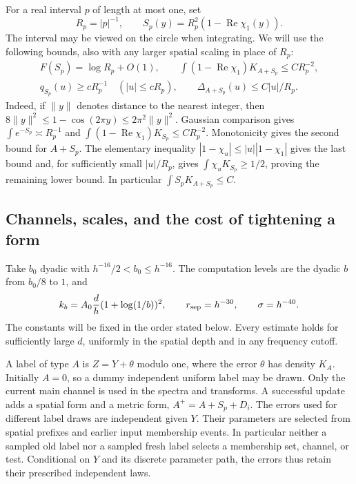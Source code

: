For a real interval $p$ of length at most one, set
\[
 R_p=|p|^{-1},\qquad
 S_p(y)=R_p^2(1-\operatorname{Re}\chi_1(y)).
\]
The interval may be viewed on the circle when integrating.  We will use
the following bounds, also with any larger spatial scaling in place of
$R_p$:
\begin{equation}\label{eq:thermal-spatial}
 \begin{gathered}
 F(S_p)=\log R_p+O(1),\qquad
 \int(1-\operatorname{Re}\chi_1)K_{A+S_p}\le C R_p^{-2},\\
 q_{S_p}(u)\ge cR_p^{-1}\quad (|u|\le cR_p),\qquad
 \Delta_{A+S_p}(u)\le C|u|/R_p.
 \end{gathered}
\end{equation}
Indeed, if $\|y\|$ denotes distance to the nearest integer, then
$8\|y\|^2\le1-\cos(2\pi y)\le2\pi^2\|y\|^2$.  Gaussian comparison
gives $\int e^{-S_p}\asymp R_p^{-1}$ and
$\int(1-\operatorname{Re}\chi_1)K_{S_p}\le CR_p^{-2}$.  Monotonicity
gives the second bound for $A+S_p$.  The elementary inequality
$|1-\chi_u|\le|u||1-\chi_1|$ gives the last bound and, for sufficiently
small $|u|/R_p$, gives $\int\chi_uK_{S_p}\ge1/2$, proving the remaining
lower bound.  In particular $\int S_pK_{A+S_p}\le C$.

\subsection{Channels, scales, and the cost of tightening a form}

Take $b_0$ dyadic with $h^{-16}/2<b_0\le h^{-16}$.  The computation
levels are the dyadic $b$ from $b_0/8$ to $1$, and
\begin{equation}\label{eq:thermal-parameters}
 k_b=A_0\frac d h(1+\log(1/b))^2,\qquad
 r_{\rm sep}=h^{-30},\qquad \sigma=h^{-40}.
\end{equation}
The constants will be fixed in the order stated below.  Every estimate
holds for sufficiently large $d$, uniformly in the spatial depth and in
any frequency cutoff.

A label of type $A$ is $Z=Y+\theta$ modulo one, where the error $\theta$
has density $K_A$.  Initially $A=0$, so a dummy independent uniform label
may be drawn.  Only the current main channel is used in the spectra and
transforms.  A successful update adds a spatial form and a metric form,
$A^+=A+S_p+D_i$.  The errors used for different label draws are
independent given $Y$.  Their parameters are selected from spatial
prefixes and earlier input membership events.  In particular neither a
sampled old label nor a sampled fresh label selects a membership set,
channel, or test.  Conditional on $Y$ and its discrete parameter path,
the errors thus retain their prescribed independent laws.

